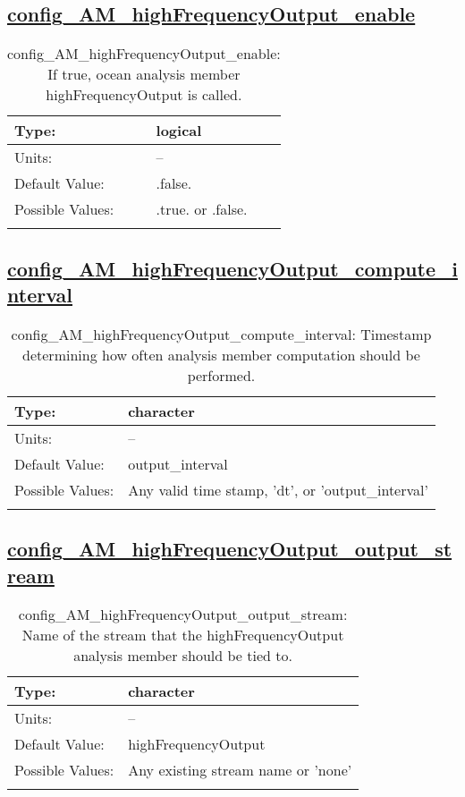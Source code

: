 \subsection[config\_AM\_highFrequencyOutput\_enable]{\hyperref[sec:nm_tab_AM_highFrequencyOutput]{config\_AM\_highFrequencyOutput\_enable}}
\label{subsec:nm_sec_config_AM_highFrequencyOutput_enable}
\begin{center}
\begin{longtable}{| p{2.0in} || p{4.0in} |}
    \hline
    Type: & logical \\
    \hline
    Units: & -- \\
    \hline
    Default Value: & .false. \\
    \hline
    Possible Values: & .true. or .false. \\
    \hline
    \caption{config\_AM\_highFrequencyOutput\_enable: If true, ocean analysis member highFrequencyOutput is called.}
\end{longtable}
\end{center}
\subsection[config\_AM\_highFrequencyOutput\_compute\_interval]{\hyperref[sec:nm_tab_AM_highFrequencyOutput]{config\_AM\_highFrequencyOutput\_compute\_interval}}
\label{subsec:nm_sec_config_AM_highFrequencyOutput_compute_interval}
\begin{center}
\begin{longtable}{| p{2.0in} || p{4.0in} |}
    \hline
    Type: & character \\
    \hline
    Units: & -- \\
    \hline
    Default Value: & output\_interval \\
    \hline
    Possible Values: & Any valid time stamp, 'dt', or 'output\_interval' \\
    \hline
    \caption{config\_AM\_highFrequencyOutput\_compute\_interval: Timestamp determining how often analysis member computation should be performed.}
\end{longtable}
\end{center}
\subsection[config\_AM\_highFrequencyOutput\_output\_stream]{\hyperref[sec:nm_tab_AM_highFrequencyOutput]{config\_AM\_highFrequencyOutput\_output\_stream}}
\label{subsec:nm_sec_config_AM_highFrequencyOutput_output_stream}
\begin{center}
\begin{longtable}{| p{2.0in} || p{4.0in} |}
    \hline
    Type: & character \\
    \hline
    Units: & -- \\
    \hline
    Default Value: & highFrequencyOutput \\
    \hline
    Possible Values: & Any existing stream name or 'none' \\
    \hline
    \caption{config\_AM\_highFrequencyOutput\_output\_stream: Name of the stream that the highFrequencyOutput analysis member should be tied to.}
\end{longtable}
\end{center}
